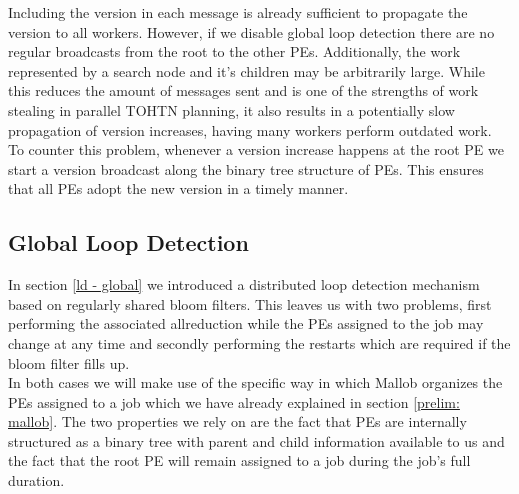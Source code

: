 Including the version in each message is already sufficient to propagate the version to all workers. However, if we disable global loop detection there are no regular broadcasts from the root to the other PEs. Additionally, the work represented by a search node and it's children may be arbitrarily large. While this reduces the amount of messages sent and is one of the strengths of work stealing in parallel TOHTN planning, it also results in a potentially slow propagation of version increases, having many workers perform outdated work. To counter this problem, whenever a version increase happens at the root PE we start a version broadcast along the binary tree structure of PEs. This ensures that all PEs adopt the new version in a timely manner.

\subsection{Global Loop Detection}
\label{impl: global loop}
In section \ref{ld - global} we introduced a distributed loop detection mechanism based on regularly shared bloom filters. This leaves us with two problems, first performing the associated allreduction while the PEs assigned to the job may change at any time and secondly performing the restarts which are required if the bloom filter fills up. \\
In both cases we will make use of the specific way in which Mallob organizes the PEs assigned to a job which we have already explained in section \ref{prelim: mallob}. The two properties we rely on are the fact that PEs are internally structured as a binary tree with parent and child information available to us and the fact that the root PE will remain assigned to a job during the job's full duration.

